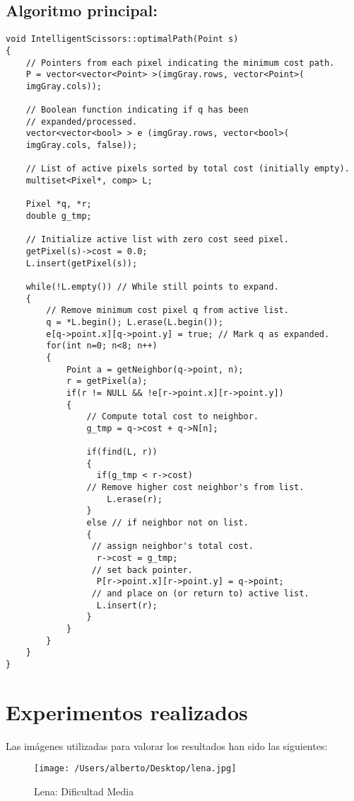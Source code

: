 \newpage
\subsection{Algoritmo principal:}

\begin{lstlisting}
void IntelligentScissors::optimalPath(Point s)
{
	// Pointers from each pixel indicating the minimum cost path.
	P = vector<vector<Point> >(imgGray.rows, vector<Point>(
	imgGray.cols));
	
	// Boolean function indicating if q has been 
	// expanded/processed.
	vector<vector<bool> > e (imgGray.rows, vector<bool>(
	imgGray.cols, false));

	// List of active pixels sorted by total cost (initially empty).
	multiset<Pixel*, comp> L;
	
	Pixel *q, *r;
	double g_tmp;

	// Initialize active list with zero cost seed pixel.	
	getPixel(s)->cost = 0.0;
	L.insert(getPixel(s));

	while(!L.empty()) // While still points to expand.
	{
		// Remove minimum cost pixel q from active list.
		q = *L.begin(); L.erase(L.begin()); 
		e[q->point.x][q->point.y] = true; // Mark q as expanded.
		for(int n=0; n<8; n++)
		{
			Point a = getNeighbor(q->point, n);
			r = getPixel(a);			
			if(r != NULL && !e[r->point.x][r->point.y])
			{
				// Compute total cost to neighbor.
				g_tmp = q->cost + q->N[n]; 
				
				if(find(L, r))
				{
				  if(g_tmp < r->cost)
				// Remove higher cost neighbor's from list.
				    L.erase(r); 
				}
				else // if neighbor not on list.
				{
				 // assign neighbor's total cost.
				  r->cost = g_tmp; 
				 // set back pointer.
				  P[r->point.x][r->point.y] = q->point; 
				 // and place on (or return to) active list.
				  L.insert(r); 
				}
			}
		}
	}
}
\end{lstlisting}
\newpage

\section{Experimentos realizados}

Las imágenes utilizadas para valorar los resultados han sido las siguientes:

\begin{figure}[H] %
\centering
\texttt{[image: /Users/alberto/Desktop/lena.jpg]}  %
\label{kk1}
\caption{Lena: Dificultad Media} 
\end{figure}

